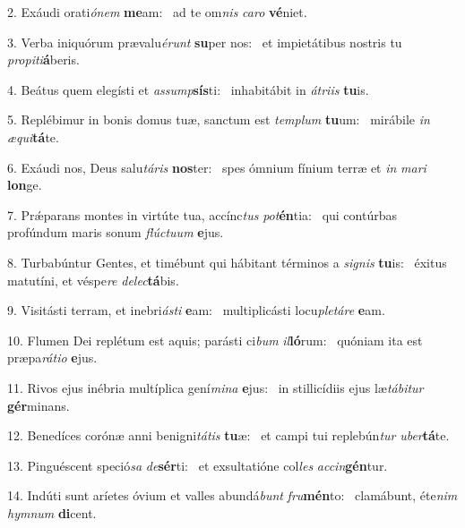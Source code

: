 2. Exáudi orati\textit{ó}\textit{nem} \textbf{me}am: \ast\  ad te om\textit{nis} \textit{ca}\textit{ro} \textbf{vé}niet.\

3. Verba iniquórum prævalu\textit{é}\textit{runt} \textbf{su}per nos: \ast\  et impietátibus nostris tu \textit{pro}\textit{pi}\textit{ti}\textbf{á}beris.\

4. Beátus quem elegísti et \textit{as}\textit{sump}\textbf{sís}ti: \ast\  inhabitábit in \textit{á}\textit{tri}\textit{is} \textbf{tu}is.\

5. Replébimur in bonis domus tuæ, sanctum est \textit{tem}\textit{plum} \textbf{tu}um: \ast\  mirábile \textit{in} \textit{æ}\textit{qui}\textbf{tá}te.\

6. Exáudi nos, Deus salu\textit{tá}\textit{ris} \textbf{nos}ter: \ast\  spes ómnium fínium terræ et \textit{in} \textit{ma}\textit{ri} \textbf{lon}ge.\

7. Prǽparans montes in virtúte tua, accínc\textit{tus} \textit{pot}\textbf{én}tia: \ast\  qui contúrbas profúndum maris sonum \textit{flúc}\textit{tu}\textit{um} \textbf{e}jus.\

8. Turbabúntur Gentes, et timébunt qui hábitant términos a \textit{si}\textit{gnis} \textbf{tu}is: \ast\  éxitus matutíni, et véspe\textit{re} \textit{de}\textit{lec}\textbf{tá}bis.\

9. Visitásti terram, et inebri\textit{ás}\textit{ti} \textbf{e}am: \ast\  multiplicásti locu\textit{ple}\textit{tá}\textit{re} \textbf{e}am.\

10. Flumen Dei replétum est aquis; parásti ci\textit{bum} \textit{il}\textbf{ló}rum: \ast\  quóniam ita est præpa\textit{rá}\textit{ti}\textit{o} \textbf{e}jus.\

11. Rivos ejus inébria multíplica gení\textit{mi}\textit{na} \textbf{e}jus: \ast\  in stillicídiis ejus læ\textit{tá}\textit{bi}\textit{tur} \textbf{gér}minans.\

12. Benedíces corónæ anni benigni\textit{tá}\textit{tis} \textbf{tu}æ: \ast\  et campi tui replebún\textit{tur} \textit{u}\textit{ber}\textbf{tá}te.\

13. Pinguéscent speció\textit{sa} \textit{de}\textbf{sér}ti: \ast\  et exsultatióne col\textit{les} \textit{ac}\textit{cin}\textbf{gén}tur.\

14. Indúti sunt aríetes óvium et valles abundá\textit{bunt} \textit{fru}\textbf{mén}to: \ast\  clamábunt, éte\textit{nim} \textit{hym}\textit{num} \textbf{di}cent.\

